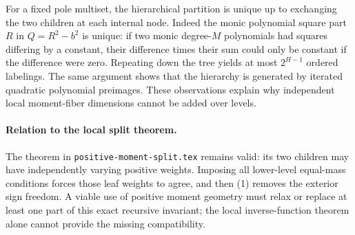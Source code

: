 \documentclass[11pt]{article}
\begin{document}
For a fixed pole multiset, the hierarchical partition is unique up to
exchanging the two children at each internal node. Indeed the monic
polynomial square part $R$ in $Q=R^2-b^2$ is unique: if two monic
degree-$M$ polynomials had squares differing by a constant, their
difference times their sum could only be constant if the difference
were zero. Repeating down the tree yields at most $2^{H-1}$ ordered
labelings. The same argument shows that the hierarchy is generated by
iterated quadratic polynomial preimages. These observations explain
why independent local moment-fiber dimensions cannot be added over levels.

\paragraph{Relation to the local split theorem.}
The theorem in \texttt{positive-moment-split.tex} remains valid: its two
children may have independently varying positive weights. Imposing all
lower-level equal-mass conditions forces those leaf weights to agree,
and then (1) removes the exterior sign freedom. A viable use of positive
moment geometry must relax or replace at least one part of this exact
recursive invariant; the local inverse-function theorem alone cannot
provide the missing compatibility.
\end{document}
